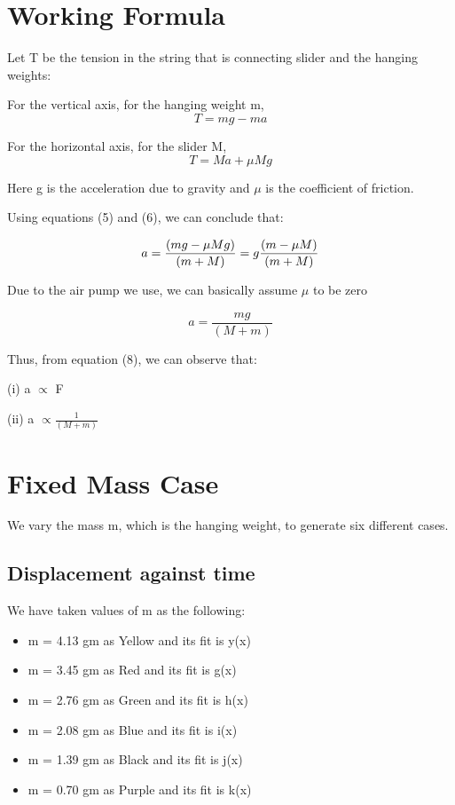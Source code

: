 \documentclass[12pt, letterpaper]{article}
\begin{document}
\section{Working Formula}
Let T be the tension in the string that is connecting slider and the hanging weights:

For the vertical axis, for the hanging weight m,
\begin{equation}
    T = mg - ma
\end{equation}

For the horizontal axis, for the slider M,
\begin{equation}
    T = Ma + \mu Mg
\end{equation}

Here g is the acceleration due to gravity and $\mu$ is the coefficient of friction. 

Using equations (5) and (6), we can conclude that:

\begin{equation}
    a = \frac{(mg - \mu Mg)}{(m + M)} \\
      = g\frac{(m - \mu M)}{(m + M)}
\end{equation}

Due to the air pump we use, we can basically assume $\mu$ to be zero

\begin{equation}
    a = \frac{mg}{(M + m)} 
\end{equation}

Thus, from equation (8), we can observe that:
\begin{center}
    (i) a $\propto$ F 

    (ii) a $\propto \frac{1}{(M+m)}$
\end{center}

\vspace{3cm}

\section{Fixed Mass Case}
We vary the mass m, which is the hanging weight, to generate six different cases.
\subsection{Displacement against time}

We have taken values of m as the following:
\begin{itemize}
     \item m = 4.13 gm as Yellow and its fit is y(x)
    \item m = 3.45 gm as Red and its fit is g(x)
    \item m = 2.76 gm as Green and its fit is h(x)
    \item m = 2.08 gm as Blue and its fit is i(x)
    \item m = 1.39 gm as Black and its fit is j(x)
    \item m = 0.70 gm as Purple and its fit is k(x)
\end{itemize}
 
\end{document}
